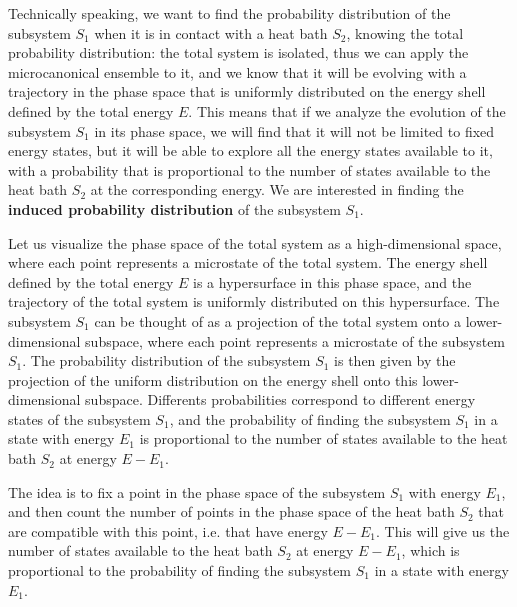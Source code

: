 Technically speaking, we want to find the probability distribution of the subsystem \(S_1\) when it is in contact with a heat bath \(S_2\), knowing the total probability distribution: the total system is isolated, thus we can apply the microcanonical ensemble to it, and we know that it will be evolving with a trajectory in the phase space that is uniformly distributed on the energy shell defined by the total energy \(E\). This means that if we analyze the evolution of the subsystem \(S_1\) in its phase space, we will find that it will not be limited to fixed energy states, but it will be able to explore all the energy states available to it, with a probability that is proportional to the number of states available to the heat bath \(S_2\) at the corresponding energy. We are interested in finding the \textbf{induced probability distribution} of the subsystem \(S_1\).

Let us visualize the phase space of the total system as a high-dimensional space, where each point represents a microstate of the total system. The energy shell defined by the total energy \(E\) is a hypersurface in this phase space, and the trajectory of the total system is uniformly distributed on this hypersurface. The subsystem \(S_1\) can be thought of as a projection of the total system onto a lower-dimensional subspace, where each point represents a microstate of the subsystem \(S_1\). The probability distribution of the subsystem \(S_1\) is then given by the projection of the uniform distribution on the energy shell onto this lower-dimensional subspace. Differents probabilities correspond to different energy states of the subsystem \(S_1\), and the probability of finding the subsystem \(S_1\) in a state with energy \(E_1\) is proportional to the number of states available to the heat bath \(S_2\) at energy \(E - E_1\).

The idea is to fix a point in the phase space of the subsystem \(S_1\) with energy \(E_1\), and then count the number of points in the phase space of the heat bath \(S_2\) that are compatible with this point, i.e. that have energy \(E - E_1\). This will give us the number of states available to the heat bath \(S_2\) at energy \(E - E_1\), which is proportional to the probability of finding the subsystem \(S_1\) in a state with energy \(E_1\).

